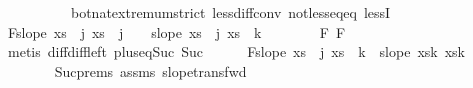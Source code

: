\begin{isabellebody}
\ \ \ \ \ \ \ \ \ \ bot{\isacharunderscore}{\kern0pt}nat{\isacharunderscore}{\kern0pt}{}{\isachardot}{\kern0pt}extremum{\isacharunderscore}{\kern0pt}strict\ less{\isacharunderscore}{\kern0pt}diff{\isacharunderscore}{\kern0pt}conv\ not{\isacharunderscore}{\kern0pt}less{\isacharunderscore}{\kern0pt}eq{\isacharunderscore}{\kern0pt}eq\ lessI{\isacharparenright}{\kern0pt}\isanewline
\ \ \ \ \isamarkupfalse%
\ F{}{\isacharcolon}{\kern0pt}{\isachardoublequoteopen}slope\ {\isacharparenleft}{\kern0pt}xs\ {\isacharbang}{\kern0pt}\ j{\isacharparenright}{\kern0pt}\ {\isacharparenleft}{\kern0pt}xs\ {\isacharbang}{\kern0pt}\ {\isacharparenleft}{\kern0pt}j\ {\isacharplus}{\kern0pt}\ {}{\isacharparenright}{\kern0pt}{\isacharparenright}{\kern0pt}\ {\isacharless}{\kern0pt}\ slope\ {\isacharparenleft}{\kern0pt}xs\ {\isacharbang}{\kern0pt}\ j{\isacharparenright}{\kern0pt}\ {\isacharparenleft}{\kern0pt}xs\ {\isacharbang}{\kern0pt}\ {\isacharparenleft}{\kern0pt}k{\isacharminus}{\kern0pt}{}{\isacharparenright}{\kern0pt}{\isacharparenright}{\kern0pt}{\isachardoublequoteclose}\isanewline
\ \ \ \ \ \ \isamarkupfalse%
\ F{}\ F{}\ \isamarkupfalse%
\ {\isacharparenleft}{\kern0pt}metis\ diff{\isacharunderscore}{\kern0pt}diff{\isacharunderscore}{\kern0pt}left\ plus{\isacharunderscore}{\kern0pt}{}{\isacharunderscore}{\kern0pt}eq{\isacharunderscore}{\kern0pt}Suc\ Suc{\isacharparenleft}{\kern0pt}{}{\isacharparenright}{\kern0pt}{\isacharparenright}{\kern0pt}\isanewline
\ \ \ \ \isamarkupfalse%
\ F{}{\isacharcolon}{\kern0pt}{\isachardoublequoteopen}slope\ {\isacharparenleft}{\kern0pt}xs\ {\isacharbang}{\kern0pt}\ j{\isacharparenright}{\kern0pt}\ {\isacharparenleft}{\kern0pt}xs\ {\isacharbang}{\kern0pt}\ {\isacharparenleft}{\kern0pt}k{\isacharminus}{\kern0pt}{}{\isacharparenright}{\kern0pt}{\isacharparenright}{\kern0pt}\ {\isacharless}{\kern0pt}\ slope\ {\isacharparenleft}{\kern0pt}xs{\isacharbang}{\kern0pt}{\isacharparenleft}{\kern0pt}k{\isacharminus}{\kern0pt}{}{\isacharparenright}{\kern0pt}{\isacharparenright}{\kern0pt}\ {\isacharparenleft}{\kern0pt}xs{\isacharbang}{\kern0pt}{\isacharparenleft}{\kern0pt}k{\isacharparenright}{\kern0pt}{\isacharparenright}{\kern0pt}{\isachardoublequoteclose}\isanewline
\ \ \ \ \ \ \isamarkupfalse%
\ Suc{\isachardot}{\kern0pt}prems\ assms{\isacharparenleft}{\kern0pt}{}{\isacharparenright}{\kern0pt}\ slope{\isacharunderscore}{\kern0pt}trans{\isacharunderscore}{\kern0pt}fwd\ \isamarkupfalse%

\end{isabellebody}
